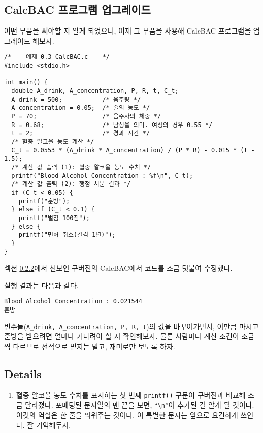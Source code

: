 \documentclass[../main.tex]{subfiles}
\begin{document}
\subsection{CalcBAC 프로그램 업그레이드}

어떤 부품을 써야할 지 알게 되었으니, 이제 그 부품을 사용해 CalcBAC
프로그램을 업그레이드 해보자.

\begin{verbatim}
/*--- 예제 0.3 CalcBAC.c ---*/
#include <stdio.h>

int main() {
  double A_drink, A_concentration, P, R, t, C_t;
  A_drink = 500;           /* 음주량 */
  A_concentration = 0.05;  /* 술의 농도 */
  P = 70;                  /* 음주자의 체중 */
  R = 0.68;                /* 남성을 의미. 여성의 경우 0.55 */
  t = 2;                   /* 경과 시간 */
  /* 혈중 알코올 농도 계산 */
  C_t = 0.0553 * (A_drink * A_concentration) / (P * R) - 0.015 * (t - 1.5);
  /* 계산 값 출력 (1): 혈중 알코올 농도 수치 */
  printf("Blood Alcohol Concentration : %f\n", C_t);
  /* 계산 값 출력 (2): 행정 처분 결과 */
  if (C_t < 0.05) {
    printf("훈방");
  } else if (C_t < 0.1) {
    printf("벌점 100점");
  } else {
    printf("면허 취소(결격 1년)");
  }
}
\end{verbatim}

섹션 \hyperref[sec:0.2.2]{0.2.2}에서 선보인 구버전의 CalcBAC에서 코드를
조금 덧붙여 수정했다.

실행 결과는 다음과 같다.
\begin{verbatim}
Blood Alcohol Concentration : 0.021544
훈방
\end{verbatim}

변수들(\texttt{A\_drink, A\_concentration, P, R, t})의 값을
바꾸어가면서, 이만큼 마시고 훈방을 받으려면 얼마나 기다려야 할 지
확인해보자. 물론 사람마다 계산 조건이 조금씩 다르므로 전적으로 믿지는
말고, 재미로만 보도록 하자.

\subsection{Details}
\begin{enumerate}
\item 혈중 알코올 농도 수치를 표시하는 첫 번째 \texttt{printf()} 구문이
  구버전과 비교해 조금 달라졌다. 포매팅된 문자열의 맨 끝을 보면,
  ``\texttt{\textbackslash{}n}''이 추가된 걸 알게 될 것이다. 이것의
  역할은 한 줄을 띄워주는 것이다. 이 특별한 문자는 앞으로 요긴하게
  쓰인다. 잘 기억해두자.
\end{enumerate}
\end{document}
